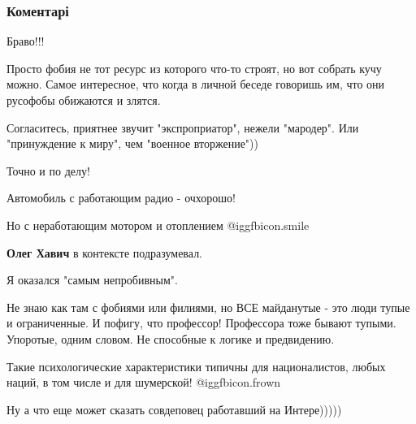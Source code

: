  
 
 
 
 
\subsubsection{Коментарі}
\label{sec:21_11_2018.fb.lesev_igor.1.za_chto_stojal_maidan.cmt}

\begin{itemize} %
Браво!!!


Просто фобия не тот ресурс из которого что-то строят, но вот собрать кучу
можно. Самое интересное, что когда в личной беседе говоришь им, что они
русофобы обижаются и злятся.

\begin{itemize} %
Согласитесь, приятнее звучит "экспроприатор", нежели "мародер". Или "принуждение к миру", чем "военное вторжение"))
\end{itemize} %

Точно и по делу!

Автомобиль с работающим радио - очхорошо!

\begin{itemize} %
Но с неработающим мотором и отоплением  @igg{fbicon.smile} 

\textbf{Олег Хавич} в контексте подразумевал.
\end{itemize} %


Я оказался "самым непробивным".

Не знаю как там с фобиями или филиями, но ВСЕ майданутые - это люди тупые и
ограниченные. И пофигу, что профессор! Профессора тоже бывают тупыми. Упоротые,
одним словом. Не способные к логике и предвидению.

\begin{itemize} %
Такие психологические характеристики типичны для националистов, любых наций, в том числе и для шумерской!  @igg{fbicon.frown} 

Ну а что еще может сказать совдеповец работавший на Интере)))))


\end{itemize}
\end{itemize}
